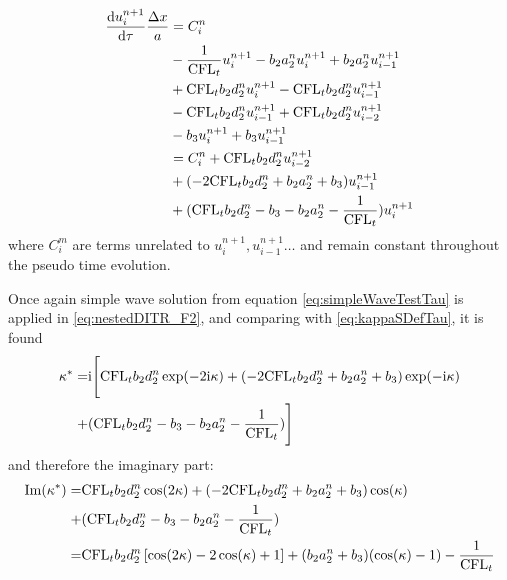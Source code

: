\begin{equation}
    \begin{aligned}
        \frac{\dd u_i^{n+1}}{\dd \tau}\frac{{\Delta} x}{a} & =
        C_i^n                                              \\
                                                       &
        -  \frac{1}{\text{CFL}_t} u_i^{n+1}
        -  b_2a_2^n u_i^{n+1}
        +  b_2a_2^n u_{i-1}^{n+1}
        \\
                                                       &
        + \text{CFL}_t b_2 d_2^n u_i^{n+1}
        - \text{CFL}_t b_2 d_2^n u_{i-1}^{n+1}
        \\
                                                       &
        - \text{CFL}_t b_2 d_2^n u_{i-1}^{n+1}
        + \text{CFL}_t b_2 d_2^n u_{i-2}^{n+1}
        \\
                                                       &
        -b_3 u_i^{n+1}
        +b_3 u_{i-1}^{n+1}
        \\
                                                       &
        =C_i^n  +  \text{CFL}_t b_2 d_2^n u_{i-2}^{n+1}
        \\
                                                       & +
        (-2\text{CFL}_t b_2 d_2^n + b_2a_2^n + b_3)u_{i-1}^{n+1}
        \\
                                                       & +
        (\text{CFL}_t b_2 d_2^n - b_3 - b_2a_2^n -  \frac{1}{\text{CFL}_t})u_i^{n+1}
        \label{eq:nestedDITR_F2}
    \end{aligned}
\end{equation}
where $C_i^m$ are terms unrelated to $u_i^{n+1}, u_{i-1}^{n+1}\dots$
and remain constant throughout the pseudo time evolution.

Once again simple wave solution from equation \eqref{eq:simpleWaveTestTau}
is applied in \eqref{eq:nestedDITR_F2}, and comparing with
\eqref{eq:kappaSDefTau}, it is found
\begin{equation}
    \begin{aligned}
        \kappa^* = & \mathrm{i}
        \Biggl[
            \text{CFL}_t b_2 d_2^n \exp(-2\mathrm{i}\kappa)
            +
            (-2\text{CFL}_t b_2 d_2^n + b_2a_2^n + b_3)\exp(-\mathrm{i}\kappa)
        \\ + &
            (\text{CFL}_t b_2 d_2^n - b_3 - b_2a_2^n -  \frac{1}{\text{CFL}_t})
            \Biggr]
    \end{aligned}
\end{equation}
and therefore the imaginary part:
\begin{equation}
    \begin{aligned}
        \mathrm{Im}(\kappa^*) = &
        \text{CFL}_t b_2 d_2^n \cos(2\kappa)
        +
        (-2\text{CFL}_t b_2 d_2^n + b_2a_2^n + b_3)\cos(\kappa)
        \\ + &
        (\text{CFL}_t b_2 d_2^n - b_3 - b_2a_2^n -  \frac{1}{\text{CFL}_t})
        \\
        =                 &
        \text{CFL}_t b_2 d_2^n \left[\cos(2\kappa) -2\cos(\kappa) + 1\right]
        + (b_2a_2^n + b_3) (\cos(\kappa) - 1) - \frac{1}{\text{CFL}_t}
    \end{aligned}
    \label{eq:imagKsTauDITR}
\end{equation}

